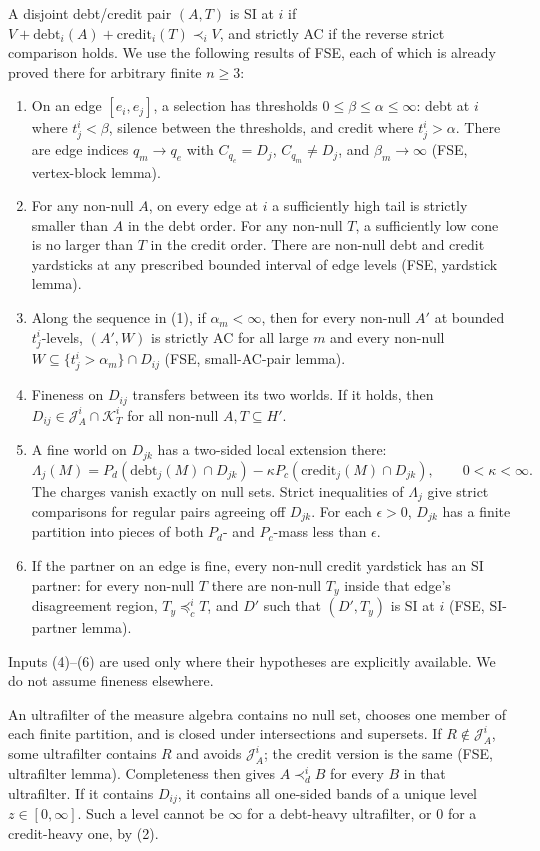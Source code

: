 \documentclass[11pt]{article}
\theoremstyle{remark}\newtheorem{remark}[theorem]{Remark}
\newcommand{\cred}{\mathrm{credit}}
\newcommand{\debt}{\mathrm{debt}}
\newcommand{\J}{\mathcal J}
\newcommand{\K}{\mathcal K}
\begin{document}
A disjoint debt/credit pair $(A,T)$ is SI at $i$ if
$V+\debt_i(A)+\cred_i(T)\prec_iV$, and strictly AC if the reverse
strict comparison holds. We use the following results of FSE, each of
which is already proved there for arbitrary finite $n\ge3$:
\begin{enumerate}[label=(\arabic*),leftmargin=*,itemsep=3pt]
\item On an edge $[e_i,e_j]$, a selection has thresholds
$0\le\beta\le\alpha\le\infty$: debt at $i$ where $t^i_j<\beta$,
silence between the thresholds, and credit where $t^i_j>\alpha$.
There are edge indices $q_m\to q_e$ with $C_{q_e}=D_j$,
$C_{q_m}\ne D_j$, and $\beta_m\to\infty$ (FSE, vertex-block lemma).
\item For any non-null $A$, on every edge at $i$ a sufficiently high
tail is strictly smaller than $A$ in the debt order. For any non-null
$T$, a sufficiently low cone is no larger than $T$ in the credit order.
There are non-null debt and credit yardsticks at any prescribed bounded
interval of edge levels (FSE, yardstick lemma).
\item Along the sequence in (1), if $\alpha_m<\infty$, then for every
non-null $A'$ at bounded $t^i_j$-levels, $(A',W)$ is strictly AC for all
large $m$ and every non-null $W\subseteq\{t^i_j>\alpha_m\}\cap D_{ij}$
(FSE, small-AC-pair lemma).
\item Fineness on $D_{ij}$ transfers between its two worlds. If it holds,
then $D_{ij}\in\J^i_A\cap\K^i_T$ for all non-null $A,T\subseteq H'$.
\item A fine world on $D_{jk}$ has a two-sided local extension there:
\[
 \Lambda_j(M)=P_d(\debt_j(M)\cap D_{jk})-
 \kappa P_c(\cred_j(M)\cap D_{jk}),\qquad 0<\kappa<\infty.
\]
The charges vanish exactly on null sets. Strict inequalities of
$\Lambda_j$ give strict comparisons for regular pairs agreeing off
$D_{jk}$. For each $\epsilon>0$, $D_{jk}$ has a finite partition into
pieces of both $P_d$- and $P_c$-mass less than $\epsilon$.
\item If the partner on an edge is fine, every non-null credit yardstick
has an SI partner: for every non-null $T$ there are non-null $T_y$
inside that edge's disagreement region, $T_y\preceq^i_cT$, and $D'$ such
that $(D',T_y)$ is SI at $i$ (FSE, SI-partner lemma).
\end{enumerate}
Inputs (4)--(6) are used only where their hypotheses are explicitly
available. We do not assume fineness elsewhere.

An ultrafilter of the measure algebra contains no null set, chooses one
member of each finite partition, and is closed under intersections and
supersets. If $R\notin\J^i_A$, some ultrafilter contains $R$ and avoids
$\J^i_A$; the credit version is the same (FSE, ultrafilter lemma).
Completeness then gives $A\prec^i_dB$ for every $B$ in that ultrafilter.
If it contains $D_{ij}$, it contains all one-sided bands of a unique
level $z\in[0,\infty]$. Such a level cannot be $\infty$ for a debt-heavy
ultrafilter, or $0$ for a credit-heavy one, by (2).
\end{document}

